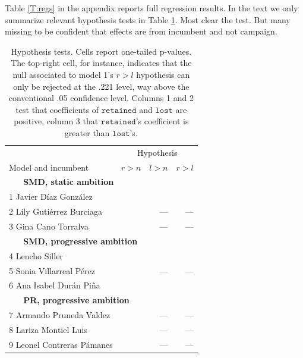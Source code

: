 \documentclass[letter,12pt]{article}
\begin{document}
Table \ref{T:regs} in the appendix reports full regression results. In the text we only summarize relevant hypothesis tests in Table \ref{T:hyp-tests}. Most clear the test. But many missing to be confident that effects are from incumbent and not campaign.

\begin{table}
\centering
  \begin{tabular}{lrrr}
                          & \multicolumn{3}{c}{Hypothesis} \\
  Model and incumbent     & $r>n$ & $l>n$ & $r>l$ \\ \hline
  \multicolumn{4}{l}{\textbf{~~~SMD, static ambition}} \\
1 Javier Díaz González    & \color{green}{$<.001$} & \color{green}{$.029$} & \color{red}{$.221$} \\
2 Lily Gutiérrez Burciaga & \color{green}{$<.001$} & ---    & --- \\
3 Gina Cano Torralva      & \color{green}{$<.001$} & ---    & --- \\
  \multicolumn{4}{l}{\textbf{~~~SMD, progressive ambition}} \\
4 Lencho Siller           & \color{green}{$<.001$} & \color{green}{$.003$} & \color{green}{$.001$} \\
5 Sonia Villarreal Pérez  & \color{green}{$<.001$} & ---    & --- \\
6 Ana Isabel Durán Piña   & \color{green}{$<.001$} & \color{green}{$.036$} & \color{green}{$<.001$} \\
  \multicolumn{4}{l}{\textbf{~~~PR, progressive ambition}} \\
7 Armando Pruneda Valdez  & \color{green}{$.030$}  & ---    & --- \\
8 Lariza Montiel Luis     & \color{red}{$.385$}    & ---    & --- \\
9 Leonel Contreras Pámanes& \color{green}{$<.001$} & ---    & --- \\ \hline
\end{tabular}
\caption{Hypothesis tests. Cells report one-tailed p-values. The top-right cell, for instance, indicates that the null associated to model 1's $r>l$ hypothesis can only be rejected at the .221 level, way above the conventional .05 confidence level. Columns 1 and 2 test that coefficients of $\texttt{retained}$ and $\texttt{lost}$ are positive, column 3 that $\texttt{retained}$'s coefficient is greater than $\texttt{lost}$'s.}\label{T:hyp-tests}
\end{table}
\end{document}
